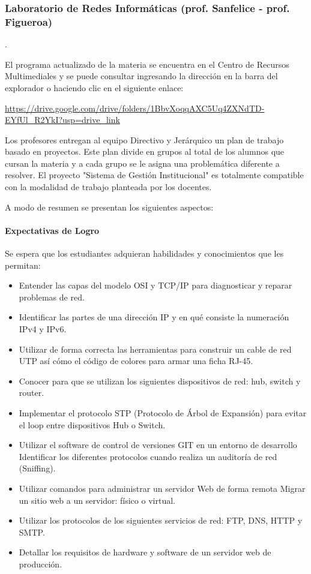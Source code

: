 \subsubsection{Laboratorio de Redes Informáticas (prof. Sanfelice - prof. Figueroa)}.

El programa actualizado de la materia se encuentra en el Centro de Recursos Multimediales y se puede consultar ingresando la dirección en la barra del explorador o haciendo clic en el siguiente enlace:

\url{https://drive.google.com/drive/folders/1BbvXoqqAXC5Uq4ZXNdTD-EYfUl_R2YkI?usp=drive_link}

Los profesores entregan al equipo Directivo y Jerárquico un plan de trabajo basado en proyectos. Este plan divide en grupos al total de los alumnos que cursan la materia y a cada grupo se le asigna una problemática diferente a resolver. El proyecto "Sistema de Gestión Institucional" es totalmente compatible con la modalidad de trabajo planteada por los docentes.

A modo de resumen se presentan los siguientes aspectos:
\paragraph{Expectativas de Logro}
Se espera que los estudiantes adquieran habilidades y conocimientos que les permitan: 

\begin{itemize}
    \item Entender las capas del modelo OSI y TCP/IP para diagnosticar y reparar problemas de red.
    \item Identificar las partes de una dirección IP y en qué consiste la numeración IPv4 y IPv6.
    \item Utilizar de forma correcta las herramientas para construir un cable de red UTP así cómo el código de colores para armar una ficha RJ-45.
    \item Conocer para que se utilizan los siguientes dispositivos de red: hub, switch y router.
    \item Implementar el protocolo STP (Protocolo de Árbol de Expansión) para evitar el loop entre dispositivos Hub o Switch.
    \item Utilizar el software de control de versiones GIT en un entorno de desarrollo
    Identificar los diferentes protocolos cuando realiza un auditoría de red (Sniffing).
    \item Utilizar comandos para administrar un servidor Web de forma remota
    Migrar un sitio web a un servidor: físico o virtual.
    \item Utilizar los protocolos de los siguientes servicios de red: FTP, DNS, HTTP y SMTP.
    \item Detallar los requisitos de hardware y software de un servidor web de producción.  
    
\end{itemize}

